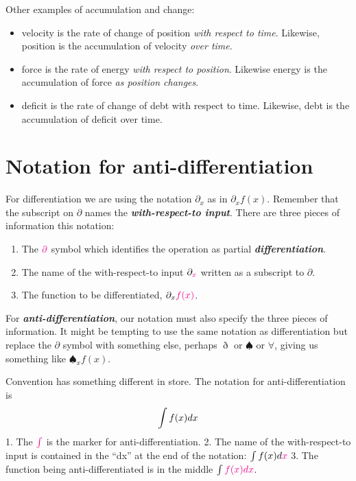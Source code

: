 \documentclass[
  letterpaper,
  DIV=11,
  numbers=noendperiod,
  oneside]{scrreprt}
\providecommand{\tightlist}{%
  \setlength{\itemsep}{0pt}\setlength{\parskip}{0pt}}
\begin{document}
Other examples of accumulation and change:

\begin{itemize}
\tightlist
\item
  velocity is the rate of change of position \emph{with respect to
  time}. Likewise, position is the accumulation of velocity \emph{over
  time}.
\item
  force is the rate of energy \emph{with respect to position}. Likewise
  energy is the accumulation of force \emph{as position changes}.
\item
  deficit is the rate of change of debt with respect to time. Likewise,
  debt is the accumulation of deficit over time.
\end{itemize}

\hypertarget{notation-for-anti-differentiation}{%
\section{Notation for
anti-differentiation}\label{notation-for-anti-differentiation}}

For differentiation we are using the notation \(\partial_x\) as in
\(\partial_x f(x)\). Remember that the subscript on \(\partial\) names
the \textbf{\emph{with-respect-to input}}. There are three pieces of
information this notation:

\begin{enumerate}
\def\labelenumi{\arabic{enumi}.}
\tightlist
\item
  The \(\color{magenta}{\partial}\) symbol which identifies the
  operation as partial \textbf{\emph{differentiation}}.
\item
  The name of the with-respect-to input
  \(\partial_{\color{magenta}{x}}\) written as a subscript to
  \(\partial\).
\item
  The function to be differentiated,
  \(\partial_x \color{magenta}{f(x)}\).
\end{enumerate}

For \textbf{\emph{anti-differentiation}}, our notation must also specify
the three pieces of information. It might be tempting to use the same
notation as differentiation but replace the \(\partial\) symbol with
something else, perhaps \(\eth\) or \(\spadesuit\) or \(\forall\),
giving us something like \(\spadesuit_x f(x)\).

Convention has something different in store. The notation for
anti-differentiation is \[\large \int f(x) dx\] 1. The
\(\color{magenta}{\int}\) is the marker for anti-differentiation. 2. The
name of the with-respect-to input is contained in the ``dx'' at the end
of the notation: \(\int f(x) d\color{magenta}{x}\) 3. The function being
anti-differentiated is in the middle \(\int \color{magenta}{f(x)} dx\).
\end{document}

